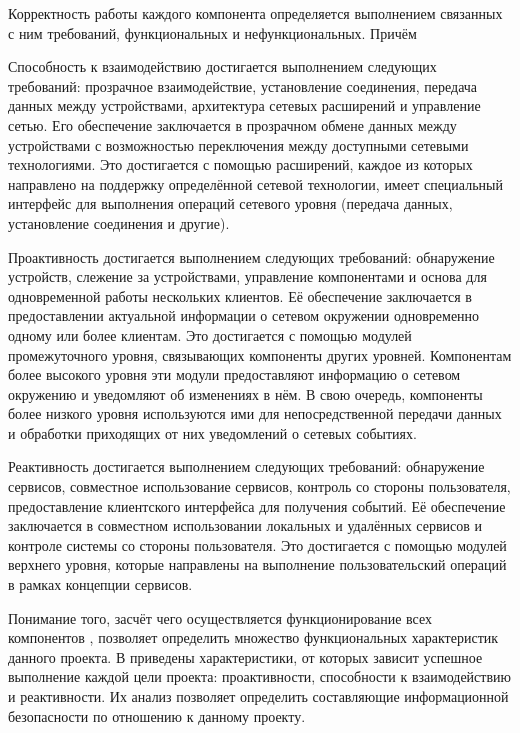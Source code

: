 

%
Корректность работы каждого компонента определяется выполнением связанных с ним требований, функциональных и нефункциональных.
%
Причём 

%
Способность к взаимодействию достигается выполнением следующих требований: прозрачное взаимодействие, установление соединения, передача данных между устройствами, архитектура сетевых расширений и управление сетью. 
%
Его обеспечение заключается в прозрачном обмене данных между устройствами с возможностью переключения между доступными сетевыми технологиями.
%
Это достигается с помощью расширений, каждое из которых направлено на поддержку определённой сетевой технологии, имеет специальный интерфейс для выполнения операций сетевого уровня (передача данных, установление соединения и другие). 

%
Проактивность достигается выполнением следующих требований: обнаружение устройств, слежение за устройствами, управление компонентами и основа для одновременной работы нескольких клиентов.
%
Её обеспечение заключается в предоставлении актуальной информации о сетевом окружении одновременно одному или более клиентам. 
%
Это достигается с помощью модулей промежуточного уровня, связывающих компоненты других уровней. 
%
Компонентам более высокого уровня эти модули предоставляют информацию о сетевом окружению и уведомляют об изменениях в нём. 
%
В свою очередь, компоненты более низкого уровня используются ими для непосредственной передачи данных и обработки приходящих от них уведомлений о сетевых событиях. 

%
Реактивность достигается выполнением следующих требований: обнаружение сервисов, совместное использование сервисов, контроль со стороны пользователя, предоставление клиентского интерфейса для получения событий.
%
Её обеспечение заключается в совместном использовании локальных и удалённых сервисов и контроле системы со стороны пользователя. 
%
Это достигается с помощью модулей верхнего уровня, которые направлены на выполнение пользовательский операций в рамках концепции сервисов. 

%
Понимание того, засчёт чего осуществляется функционирование всех компонентов \PeerHood, позволяет определить множество функциональных характеристик данного проекта. 
%
В  приведены характеристики, от которых зависит успешное выполнение каждой цели проекта: проактивности, способности к взаимодействию и реактивности. 
%
Их анализ позволяет определить составляющие информационной безопасности по отношению к данному проекту. 

